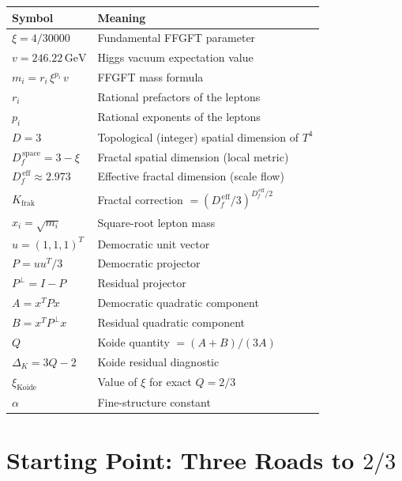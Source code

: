\begin{center}
\renewcommand{\arraystretch}{1.4}
\begin{tabular}{ll}
\toprule
\textbf{Symbol} & \textbf{Meaning} \\
\midrule
\(\xi = 4/30000\) & Fundamental FFGFT parameter \cite{Pascher2026} \\
\(v = 246.22\,\text{GeV}\) & Higgs vacuum expectation value \\
\(m_i = r_i\,\xi^{p_i}\,v\) & FFGFT mass formula \cite{PascherDok006} \\
\(r_i\) & Rational prefactors of the leptons \\
\(p_i\) & Rational exponents of the leptons \cite{PascherDok051} \\
\(D = 3\) & Topological (integer) spatial dimension of \(T^4\) \\
\(D_f^{\,\text{space}} = 3-\xi\) & Fractal spatial dimension (local metric) \cite{Pascher2026} \\
\(D_f^{\,\text{eff}} \approx 2.973\) & Effective fractal dimension (scale flow) \\
\(K_{\text{frak}}\) & Fractal correction \(= (D_f^{\,\text{eff}}/3)^{D_f^{\,\text{eff}}/2}\) \\
\(x_i = \sqrt{m_i}\) & Square-root lepton mass \\
\(u = (1,1,1)^T\) & Democratic unit vector \\
\(P = uu^T/3\) & Democratic projector \\
\(P^\perp = I - P\) & Residual projector \\
\(A = x^TPx\) & Democratic quadratic component \\
\(B = x^TP^\perp x\) & Residual quadratic component \\
\(Q\) & Koide quantity \(= (A+B)/(3A)\) \cite{Koide1983} \\
\(\Delta_K = 3Q-2\) & Koide residual diagnostic \\
\(\xi_{\text{Koide}}\) & Value of \(\xi\) for exact \(Q = 2/3\) \\
\(\alpha\) & Fine-structure constant \\
\bottomrule
\end{tabular}
\end{center}

\newpage

\section{Starting Point: Three Roads to \(2/3\)}

